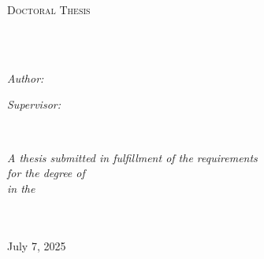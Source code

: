 \documentclass[
  letterpaper,
  11pt,
  english,
  singlespacing,
  headsepline]{MastersDoctoralThesis}
\author{Jordan B
Gunn} %
\begin{document}
\frontmatter %

\pagestyle{plain} %


\begin{titlepage}
\begin{center}

\vspace*{.06\textheight}
{\scshape\LARGE \univname\par}\vspace{1.5cm} %
\textsc{\Large Doctoral Thesis}\\[0.5cm] %

\HRule \\[0.4cm] %
{\huge \bfseries \ttitle\par}\vspace{0.4cm} %
\HRule \\[1.5cm] %
 
\begin{minipage}[t]{0.4\textwidth}
\begin{flushleft} \large
\emph{Author:}\\
\authorname
\end{flushleft}
\end{minipage}
\begin{minipage}[t]{0.4\textwidth}
\begin{flushright} \large
\emph{Supervisor:} \\
%
\supname

\end{flushright}
\end{minipage}\\[3cm]
 
\vfill

\large \textit{A thesis submitted in fulfillment of the requirements\\ for the degree of \degreename}\\[0.3cm] %
\textit{in the}\\[0.4cm]
\groupname\\
\deptname\\[2cm] %
 
\vfill


{\large July 7, 2025}\\[4cm] %

 
\vfill
\end{center}
\end{titlepage}
\end{document}
